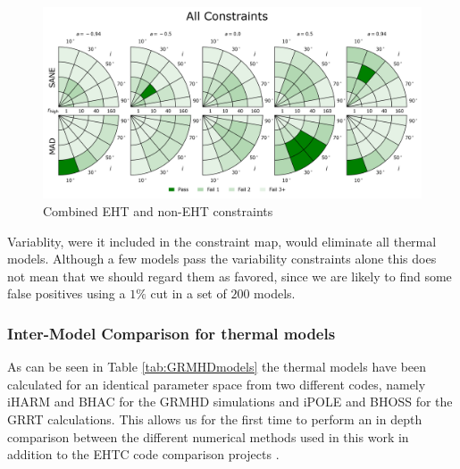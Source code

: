 \begin{figure}
  \centering
  \includegraphics[width=\columnwidth]{./figures/All_Constraints.png}
  \caption{Combined EHT and non-EHT constraints}
  \label{fig:all_cuts}
\end{figure}

Variablity, were it included in the constraint map, would eliminate all thermal models.  Although a few models pass the variability constraints alone this does not mean that we should regard them as favored, since we are likely to find some false positives using a $1\%$ cut in a set of $200$ models.

\subsubsection{Inter-Model Comparison for thermal models}

As can be seen in Table \ref{tab:GRMHDmodels} the thermal models have been calculated for an identical parameter space from two different codes, namely iHARM and BHAC for the GRMHD simulations and iPOLE and BHOSS for the GRRT calculations. This allows us for the first time to perform an in depth comparison between the different numerical methods used in this work in addition to the EHTC code comparison projects \citep{2019ApJS..243...26P,2020ApJ...897..148G}.

